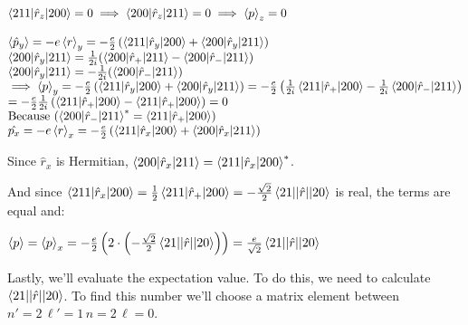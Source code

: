 \documentclass[14pt]{extarticle}
\makeatletter
\newenvironment{lefteqs}{%
    \begin{flushleft}%
    \renewcommand{\arraystretch}{1.3}%
    $\begin{array}{@{}l@{}}%
}{%
    \end{array}$%
    \end{flushleft}%
}
\makeatother
\begin{document}
\begin{lefteqs}
    \braket{211 | \hat{r}_z | 200} = 0 \implies \braket{200 | \hat{r}_z | 211} = 0 \implies \braket{p}_z = 0 \\ \\
    \braket{\hat{p}_y} = -e \braket{r}_y = -\frac{e}{2} \left( \braket{211 | \hat{r}_y | 200} + \braket{200 | \hat{r}_y | 211} \right) \\
    \braket{200 | \hat{r}_y | 211} = \frac{1}{2i} (\braket{200 | \hat{r}_+ | 211} - \braket{200 | \hat{r}_- | 211}) \\
    \braket{200 | \hat{r}_y | 211} = -\frac{1}{2i} (\braket{200 | \hat{r}_- | 211}) \\
    \implies \braket{p}_y = -\frac{e}{2} \left( \braket{211 | \hat{r}_y | 200} + \braket{200 | \hat{r}_y | 211} \right) = -\frac{e}{2} \left( \frac{1}{2i} \braket{211 | \hat{r}_+ | 200} - \frac{1}{2i} \braket{200 | \hat{r}_- | 211} \right) \\
    = -\frac{e}{2} \frac{1}{2i} \left( \braket{211 | \hat{r}_+ | 200} - \braket{211 | \hat{r}_+ | 200} \right) = 0 \\
    \text{Because } (\braket{200 | \hat{r}_- | 211}^* = \braket{211 | \hat{r}_+ | 200}) \\
    \hat{p_x} = -e \braket{r}_x = -\frac{e}{2} \left( \braket{211 | \hat{r}_x | 200} + \braket{200 | \hat{r}_x | 211} \right) \\
\end{lefteqs}
Since $\hat{r}_x$ is Hermitian, $\braket{200 | \hat{r}_x | 211} = \braket{211 | \hat{r}_x | 200}^*$.

And since $\braket{211|\hat{r}_x|200} = \frac{1}{2}\braket{211|\hat{r}_+|200} = -\frac{\sqrt{2}}{2} \braket{21 || \hat{r} || 20}$ is real, the terms are equal and:
\begin{lefteqs}
    \braket{p} = \braket{p}_x = -\frac{e}{2} \left( 2 \cdot \left(-\frac{\sqrt{2}}{2} \braket{21 || \hat{r} || 20}\right) \right) = \frac{e}{\sqrt{2}} \braket{21 || \hat{r} || 20}
\end{lefteqs}

Lastly, we'll evaluate the expectation value. To do this, we need to calculate $\braket{21 || \hat{r} || 20}$.
To find this number we'll choose a matrix element between $n'=2 \, \ell'=1 \, n=2\, \ell=0$.
\end{document}
